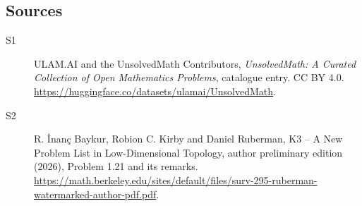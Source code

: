 \documentclass[11pt]{article}
\begin{document}
\subsection{Sources}
\begin{description}
\item[\hypertarget{source:statement:1}{S1}] ULAM.AI and the UnsolvedMath Contributors, \emph{UnsolvedMath: A Curated Collection of Open Mathematics Problems}, catalogue entry. CC BY 4.0. \url{https://huggingface.co/datasets/ulamai/UnsolvedMath}.
\item[\hypertarget{source:statement:2}{S2}] R. \.{I}nan\c{c} Baykur, Robion C. Kirby and Daniel Ruberman, K3 -- A New Problem List in Low-Dimensional Topology, author preliminary edition (2026), Problem 1.21 and its remarks. \url{https://math.berkeley.edu/sites/default/files/surv-295-ruberman-watermarked-author-pdf.pdf}.
\end{description}
\label{end:statement}
\end{document}
